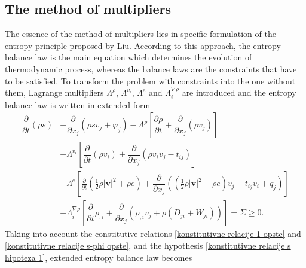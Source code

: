 \documentclass[a4paper,fleqn]{cas-sc}
\theoremstyle{definition}
\begin{document}
\subsection{The method of multipliers} 

The essence of the method of multipliers lies in specific formulation of the entropy principle proposed by Liu. According to this approach, the entropy balance law is the main equation which determines the evolution of thermodynamic process, whereas the balance laws are the constraints that have to be satisfied. To transform the problem with constraints into the one without them, Lagrange multipliers $\Lambda^\rho$, $\Lambda^{v_i}$, $\Lambda^e$ and $\Lambda^{\nabla\rho}_i$ are introduced and the entropy balance law is written in extended form
\begin{align} \label{prosirena entropijska nejednakost Kortevegovi fluidi}
	\dfrac{\partial}{\partial t}\left(\rho s\right) & +\dfrac{\partial}{\partial x_j}\left(\rho sv_j+\varphi_j\right)
	-\Lambda^\rho\left[\dfrac{\partial\rho}{\partial t}+\dfrac{\partial}{\partial x_j}\left(\rho v_j\right)\right]
	\nonumber \\
	&-\Lambda^{v_i}\left[\dfrac{\partial}{\partial t}(\rho v_i)+\dfrac{\partial}{\partial x_j}\left(\rho v_i v_j -t_{ij}\right)\right]
	\\
	&-\Lambda^e\left[\frac{\partial}{\partial t}\left(\frac{1}{2}\rho\vert\mathbf{v}\vert ^2+\rho e\right)+\dfrac{\partial}{\partial x_j}\left(\left(\frac{1}{2}\rho\vert\mathbf{v}\vert ^2+\rho e\right)v_j-t_{ij}v_i+q_j\right)\right]
	\nonumber \\
	&-\Lambda^{\nabla\rho}_i\left[\dfrac{\partial}{\partial t}\rho_{,i}+\dfrac{\partial}{\partial x_j}(\rho_{,i}v_j+\rho (D_{ji}+W_{ji}))\right]=\Sigma\geq 0. 
	\nonumber
\end{align}
Taking into account the constitutive relations \eqref{konstitutivne relacije 1 opste} and \eqref{konstitutivne relacije s-phi opste}, and the hypothesis \eqref{konstitutivne relacije s hipoteza 1}, extended entropy balance law becomes
\end{document}

